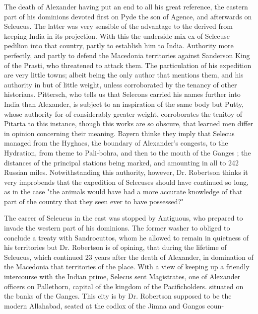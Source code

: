 The death of Alexander having put an end to all his great reference, the eastern part of his dominions devoted first on Pyde the son of Agence, and afterwards on Seleucus. The latter was very sensible of the advantage to the derived from keeping India in its projection. With this the underside mix ex-of Selecuse pedilion into that country, partly to establish him to India. Authority more perfectly, and partly to defend the Macedonia territories against Sanderson King of the Prasti, who threatened to attack them. The particulation of his expedition are very little towns; albeit being the only author that mentions them, and his authority in but of little weight, unless corroborated by the tenancy of other historians. Pittersch, who tells us that Selecons carried his names further into India than Alexander, is subject to an inspiration of the same body but Putty, whose authority for of considerably greater weight, corroborates the tenitoy of Pitarta to this instance, though this works are so obscure, that learned men differ in opinion concerning their meaning. Bayern thinke they imply that Selecus managed from the Hyghacs, the boundary of Alexander’s congests, to the Hydration, from theme to Pali-bohra, and then to the mouth of the Ganges ; the distances of the principal stations being marked, and amounting in all to 242 Russian miles. Notwithstanding this authority, however, Dr. Robertson thinks it very improbends that the expedition of Selecuses should have continued so long, as in the case "the animals would have had a more accurate knowledge of that part of the country that they seen ever to have possessed?"\par\medskip
The career of Seleucus in the east was stopped by Antiguous, who prepared to invade the western part of his dominions. The former washer to obliged to conclude a treaty with Sandrocuttos, whom he allowed to remain in quietness of his territories but Dr. Robertson is of opining, that during the lifetime of Seleucus, which continued 23 years after the death of Alexander, in domination of the Macedonia that territories of the place. With a view of keeping up a friendly intercourse with the Indian prime, Selecus sent Magistrates, one of Alexander officers on Pallethorn, capital of the kingdom of the Pacificholders. situated on the banks of the Ganges. This city is by Dr. Robertson supposed to be the modern Allahabad, seated at the codlox of the Jimna and Gangos coun-\par\medskip
